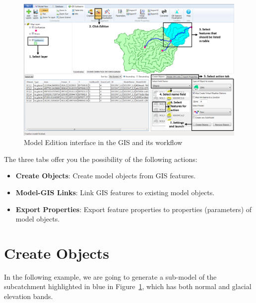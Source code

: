 \documentclass[
  letterpaper,
  DIV=11,
  numbers=noendperiod]{scrreprt}
\begin{document}
\begin{figure}

{\centering \includegraphics{./figures/fig-gis_model_edition_interface.png}

}

\caption{\label{fig-gis_model_edition_interface}Model Edition interface
in the GIS and its workflow}

\end{figure}

The three tabs offer you the possibility of the following actions:

\begin{itemize}
\item
  \textbf{Create Objects}: Create model objects from GIS features.
\item
  \textbf{Model-GIS Links}: Link GIS features to existing model objects.
\item
  \textbf{Export Properties}: Export feature properties to properties
  (parameters) of model objects.
\end{itemize}

\hypertarget{create-objects}{%
\section{Create Objects}\label{create-objects}}

In the following example, we are going to generate a sub-model of the
subcatchment highlighted in blue in
Figure~\ref{fig-gis_model_edition_interface}, which has both normal and
glacial elevation bands.
\end{document}
